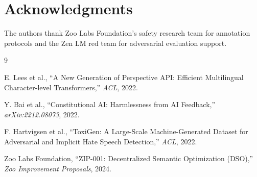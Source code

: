 \documentclass[11pt,a4paper]{article}
\begin{document}
\section*{Acknowledgments}

The authors thank Zoo Labs Foundation's safety research team for annotation protocols
and the Zen LM red team for adversarial evaluation support.


\begin{thebibliography}{9}

E. Lees et al.,
``A New Generation of Perspective API: Efficient Multilingual Character-level Transformers,''
\textit{ACL}, 2022.

Y. Bai et al.,
``Constitutional AI: Harmlessness from AI Feedback,''
\textit{arXiv:2212.08073}, 2022.

F. Hartvigsen et al.,
``ToxiGen: A Large-Scale Machine-Generated Dataset for Adversarial and Implicit Hate Speech Detection,''
\textit{ACL}, 2022.

Zoo Labs Foundation,
``ZIP-001: Decentralized Semantic Optimization (DSO),''
\textit{Zoo Improvement Proposals}, 2024.

\end{thebibliography}
\end{document}

